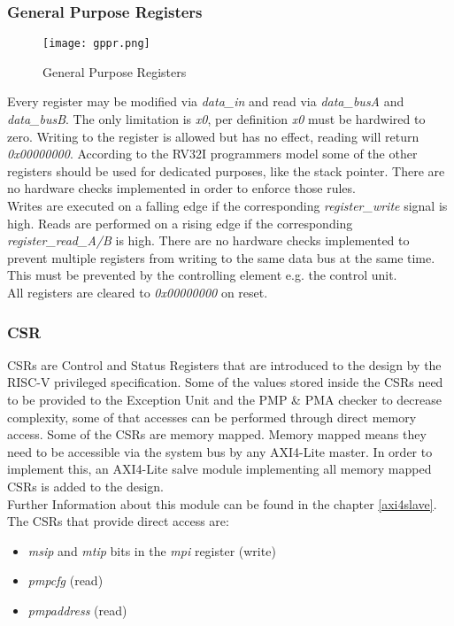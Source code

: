 \subsubsection{General Purpose Registers}
\begin{figure}[H]
	\centering
	\texttt{[image: gppr.png]}
	\caption{General Purpose Registers}
	\label{fig:gppr}
\end{figure}
Every register may be modified via \textit{data\_in} and read via \textit{data\_busA} and \textit{data\_busB}.
The only limitation is \textit{x0}, per definition \textit{x0} must be hardwired to zero. Writing to the register is allowed but has no effect, reading will return \textit{0x00000000}.
According to the RV32I programmers model some of the other registers should be
used for dedicated purposes, like the stack pointer. There are no hardware checks
implemented in order to enforce those rules.\\
Writes are executed on a falling edge if the corresponding \textit{register\_write} signal is high. Reads are performed on a rising edge if the corresponding \textit{register\_read\_A/B} is high. There are no hardware checks implemented to prevent multiple registers from writing to the same data bus at the same time. This must be prevented by the controlling element e.g. the control unit.\\
All registers are cleared to \textit{0x00000000} on reset.
\subsubsection{\acf{CSR}}
CSRs are Control and Status Registers that are introduced to the design by the
RISC-V privileged specification. Some of the values stored inside the CSRs need to
be provided to the Exception Unit and the PMP \& PMA checker to decrease
complexity, some of that accesses can be performed through direct memory access.
Some of the CSRs are memory mapped. Memory mapped means they need to be
accessible via the system bus by any AXI4-Lite master. In order to implement this,
an AXI4-Lite salve module implementing all memory mapped CSRs is added to the
design.\\
Further Information about this module can be found in the chapter \ref{axi4slave}.
The CSRs that provide direct access are:
\begin{itemize}
	\item \textit{msip} and \textit{mtip} bits in the \textit{mpi} register (write)
	\item \textit{pmpcfg} (read)
	\item \textit{pmpaddress} (read)
\end{itemize}

